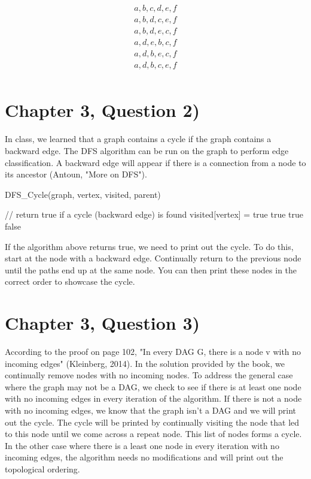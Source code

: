 \documentclass[11pt]{article}
\begin{document}
\begin{align*}
a, b, c, d, e, f \\
a, b, d, c, e, f\\
a, b, d, e, c, f\\
a, d, e, b, c, f\\
a, d, b, e, c, f\\
a, d, b, c, e, f \\
\end{align*}

\section{Chapter 3, Question 2)}
In class, we learned that a graph contains a cycle if the graph contains a backward edge. The DFS algorithm can be run on the graph to perform edge classification. A backward edge will appear if there is a connection from a node to its ancestor (Antoun, "More on DFS").


\begin{algorithm}[H]
\caption{DFS\_Cycle(graph, vertex, visited, parent)}
\begin{algorithmic} 
\STATE // return true if a cycle (backward edge) is found
\STATE visited[vertex] = true
\RETURN true
\ENDIF
\ELSE
{}
\RETURN true
\ENDIF
\ENDIF
\ENDFOR
\RETURN false
\end{algorithmic}
\end{algorithm}

If the algorithm above returns true, we need to print out the cycle. To do this, start at the node with a backward edge. Continually return to the previous node until the paths end up at the same node. You can then print these nodes in the correct order to showcase the cycle.

\section{Chapter 3, Question 3)}
According to the proof on page 102, "In every DAG G, there is a node v with no incoming edges" (Kleinberg, 2014). In the solution provided by the book, we continually remove nodes with no incoming nodes. To address the general case where the graph may not be a DAG, we check to see if there is at least one node with no incoming edges in every iteration of the algorithm. If there is not a node with no incoming edges, we know that the graph isn't a DAG and we will print out the cycle. The cycle will be printed by continually visiting the node that led to this node until we come across a repeat node. This list of nodes forms a cycle. \newline In the other case where there is a least one node in every iteration with no incoming edges, the algorithm needs no modifications and will print out the topological ordering.
\end{document}
